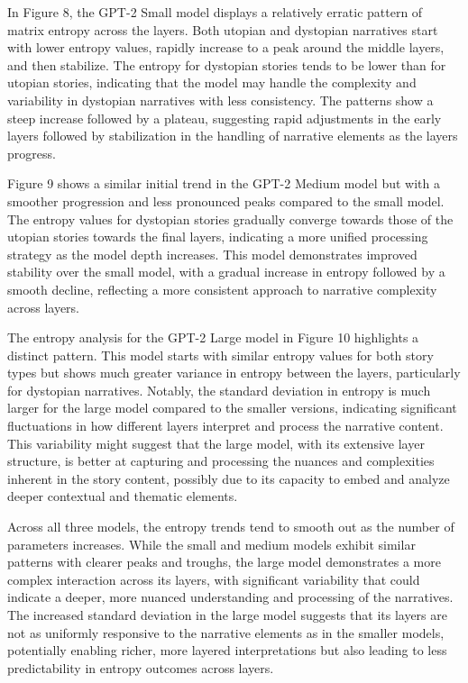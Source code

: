 \documentclass{article}
\begin{document}
In Figure 8, the GPT-2 Small model displays a relatively erratic pattern of matrix entropy across the layers. Both utopian and dystopian narratives start with lower entropy values, rapidly increase to a peak around the middle layers, and then stabilize. The entropy for dystopian stories tends to be lower than for utopian stories, indicating that the model may handle the complexity and variability in dystopian narratives with less consistency. The patterns show a steep increase followed by a plateau, suggesting rapid adjustments in the early layers followed by stabilization in the handling of narrative elements as the layers progress.

Figure 9 shows a similar initial trend in the GPT-2 Medium model but with a smoother progression and less pronounced peaks compared to the small model. The entropy values for dystopian stories gradually converge towards those of the utopian stories towards the final layers, indicating a more unified processing strategy as the model depth increases. This model demonstrates improved stability over the small model, with a gradual increase in entropy followed by a smooth decline, reflecting a more consistent approach to narrative complexity across layers.

The entropy analysis for the GPT-2 Large model in Figure 10 highlights a distinct pattern. This model starts with similar entropy values for both story types but shows much greater variance in entropy between the layers, particularly for dystopian narratives. Notably, the standard deviation in entropy is much larger for the large model compared to the smaller versions, indicating significant fluctuations in how different layers interpret and process the narrative content. This variability might suggest that the large model, with its extensive layer structure, is better at capturing and processing the nuances and complexities inherent in the story content, possibly due to its capacity to embed and analyze deeper contextual and thematic elements.

Across all three models, the entropy trends tend to smooth out as the number of parameters increases. While the small and medium models exhibit similar patterns with clearer peaks and troughs, the large model demonstrates a more complex interaction across its layers, with significant variability that could indicate a deeper, more nuanced understanding and processing of the narratives. The increased standard deviation in the large model suggests that its layers are not as uniformly responsive to the narrative elements as in the smaller models, potentially enabling richer, more layered interpretations but also leading to less predictability in entropy outcomes across layers.
\end{document}
